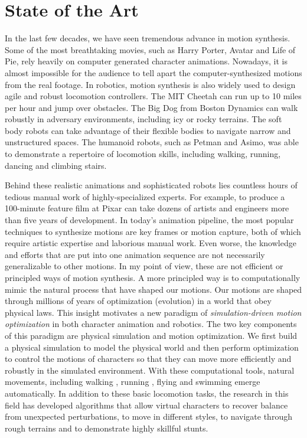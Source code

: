 \section{State of the Art}

In the last few decades, we have seen tremendous advance in motion synthesis. Some of the most breathtaking movies, such as Harry Porter, Avatar and Life of Pie, rely heavily on computer generated character animations. Nowadays, it is almost impossible for the audience to tell apart the computer-synthesized motions from the real footage. In robotics, motion synthesis is also widely used to design agile and robust locomotion controllers. The MIT Cheetah can run up to 10 miles per hour and jump over obstacles. The Big Dog from Boston Dynamics can walk robustly in adversary environments, including icy or rocky terrains. The soft body robots can take advantage of their flexible bodies to navigate narrow and unstructured spaces. The humanoid robots, such as Petman and Asimo, was able to demonstrate a repertoire of locomotion skills, including walking, running, dancing and climbing stairs.

Behind these realistic animations and sophisticated robots lies countless hours of tedious manual work of highly-specialized experts. For example, to produce a 100-minute feature film at Pixar can take dozens of artists and engineers more than five years of development. In today's animation pipeline, the most popular techniques to synthesize motions are key frames or motion capture, both of which require artistic expertise and laborious manual work. Even worse, the knowledge and efforts that are put into one animation sequence are not necessarily generalizable to other motions. In my point of view, these are not efficient or principled ways of motion synthesis. A more principled way is to computationally mimic the natural process that have shaped our motions. Our motions are shaped through millions of years of optimization (evolution) in a world that obey physical laws. This insight motivates a new paradigm of \emph{simulation-driven motion optimization} in both character animation and robotics. The two key components of this paradigm are physical simulation and motion optimization. We first build a physical simulation to model the physical world and then perform optimization to control the motions of characters so that they can move more efficiently and robustly in the simulated environment. With these computational tools, natural movements, including walking \cite{}, running \cite{}, flying \cite{} and swimming \cite{} emerge automatically. In addition to these basic locomotion tasks, the research in this field has developed algorithms that allow virtual characters to recover balance from unexpected perturbations, to move in different styles, to navigate through rough terrains and to demonstrate highly skillful stunts.

